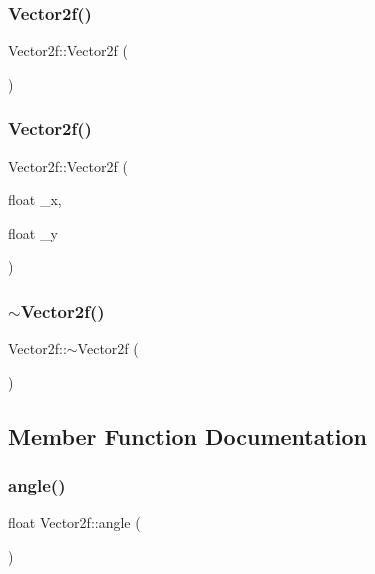 \subsubsection{\texorpdfstring{Vector2f()}{Vector2f()}\hspace{0.1cm}{\footnotesize\ttfamily [1/2]}}
{\footnotesize\ttfamily Vector2f\+::\+Vector2f (\begin{DoxyParamCaption}{ }\end{DoxyParamCaption})}

\mbox{\label{class_vector2f_a4d82d9240b5de271e5e45c16e8de561e}} 
\subsubsection{\texorpdfstring{Vector2f()}{Vector2f()}\hspace{0.1cm}{\footnotesize\ttfamily [2/2]}}
{\footnotesize\ttfamily Vector2f\+::\+Vector2f (\begin{DoxyParamCaption}\item[{float}]{\+\_\+x,  }\item[{float}]{\+\_\+y }\end{DoxyParamCaption})}

\mbox{\label{class_vector2f_a2f820078721656f1952f46b0861e19ef}} 
\subsubsection{\texorpdfstring{$\sim$Vector2f()}{~Vector2f()}}
{\footnotesize\ttfamily Vector2f\+::$\sim$\+Vector2f (\begin{DoxyParamCaption}{ }\end{DoxyParamCaption})}



\subsection{Member Function Documentation}
\mbox{\label{class_vector2f_a2d8be50dd28dc0ba8c1dcf1ecada2a23}} 
\subsubsection{\texorpdfstring{angle()}{angle()}}
{\footnotesize\ttfamily float Vector2f\+::angle (\begin{DoxyParamCaption}{ }\end{DoxyParamCaption})}


